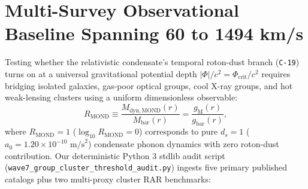 \documentclass[11pt,a4paper]{article}
\begin{document}
\section{Multi-Survey Observational Baseline Spanning 60 to 1494 km/s}

Testing whether the relativistic condensate's temporal roton-dust branch (\texttt{C-19}) turns on at a universal gravitational potential depth $|\Phi|/c^2 = \Phi_{\mathrm{crit}}/c^2$ requires bridging isolated galaxies, gas-poor optical groups, cool X-ray groups, and hot weak-lensing clusters using a uniform dimensionless observable:
\begin{equation}
  R_{\mathrm{MOND}} \equiv \frac{M_{\mathrm{dyn,MOND}}(r)}{M_{\mathrm{bar}}(r)} = \frac{g_{\mathrm{M}}(r)}{g_{\mathrm{bar}}(r)},
\end{equation}
where $R_{\mathrm{MOND}} = 1$ ($\log_{10} R_{\mathrm{MOND}} = 0$) corresponds to pure $d_s = 1$ ($a_0 = 1.20\times 10^{-10}\text{ m/s}^2$) condensate phonon dynamics with zero roton-dust contribution. Our deterministic Python 3 stdlib audit script (\texttt{wave7\_group\_cluster\_threshold\_audit.py}) ingests five primary published catalogs plus two multi-proxy cluster RAR benchmarks:
\end{document}

